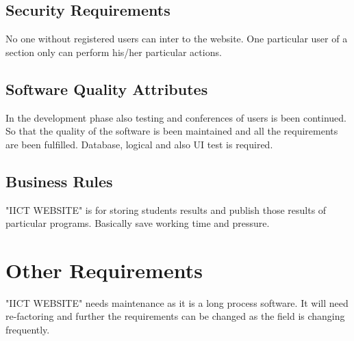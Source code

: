 \documentclass{scrreprt}
\begin{document}
    \section{Security Requirements}
    No one without registered users can inter to the website. One particular user of a section only can perform his/her particular actions. 
    
    \section{Software Quality Attributes}
    In the development phase also testing and conferences of users is been continued. So that the quality of the software is been maintained and all the requirements are been fulfilled.
    \newline
    Database, logical and also UI test is required. 
    
    \section{Business Rules}
    "IICT WEBSITE" is for storing students results and publish those results of particular programs.
    \newline
    Basically save working time and pressure. 
    
    
    \chapter{Other Requirements}
    "IICT WEBSITE" needs maintenance as it is a long process software. It will need re-factoring and further the requirements can be changed as the field is changing frequently. 
    
    
\end{document}
